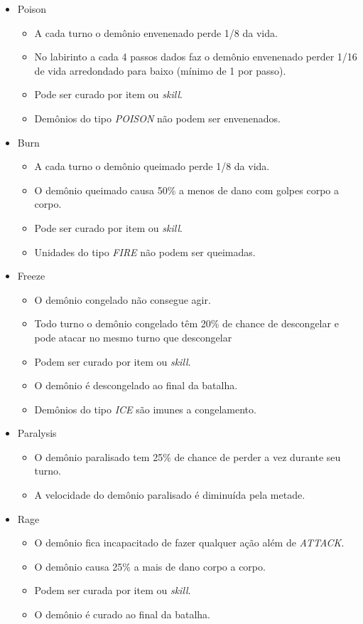 \begin{itemize}
\item Poison
	\begin{itemize}
	\item A cada turno o demônio envenenado perde 1/8 da vida.
	\item No labirinto a cada 4 passos dados faz o demônio envenenado perder 1/16 de vida arredondado para baixo (mínimo de 1 por passo).
	\item Pode ser curado por item ou \emph{skill}.
	\item Demônios do tipo \emph{POISON} não podem ser envenenados.
	\end{itemize}
\item Burn
	\begin{itemize}
	\item A cada turno o demônio queimado perde 1/8 da vida.
	\item O demônio queimado causa 50\% a menos de dano com golpes corpo a corpo.
	\item Pode ser curado por item ou \emph{skill}.
	\item Unidades do tipo \emph{FIRE} não podem ser queimadas.
	\end{itemize}
\item Freeze
	\begin{itemize}
	\item O demônio congelado não consegue agir.
	\item Todo turno o demônio congelado têm 20\% de chance de descongelar e pode atacar no mesmo turno que descongelar
	\item Podem ser curado por item ou \emph{skill}.
	\item O demônio é descongelado ao final da batalha.
	\item Demônios do tipo \emph{ICE} são imunes a congelamento.
	\end{itemize}
\item Paralysis
	\begin{itemize}
	\item O demônio paralisado tem 25\% de chance de perder a vez durante seu turno.
	\item A velocidade do demônio paralisado é diminuída pela metade. 
	\end{itemize}
\item Rage
	\begin{itemize}
	\item O demônio fica incapacitado de fazer qualquer ação além de \emph{ATTACK}.
	\item O demônio causa 25\% a mais de dano corpo a corpo.
	\item Podem ser curada por item ou \emph{skill}.
	\item O demônio é curado ao final da batalha.
	\end{itemize}
\end{itemize}

